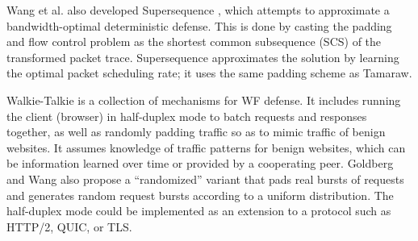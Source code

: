 \documentclass[runningheads]{llncs}
\begin{document}
Wang et al. also developed Supersequence \cite{wang2016website}, which attempts to approximate a bandwidth-optimal
deterministic defense. This is done by casting the padding and flow control problem as the shortest common
subsequence (SCS) of the transformed packet trace. Supersequence approximates the solution by learning the optimal
packet scheduling rate; it uses the same padding scheme as Tamaraw.

Walkie-Talkie \cite{wang2015walkie} is a collection of mechanisms for WF defense. It includes running
the client (browser) in half-duplex mode to batch requests and responses together, as well as randomly
padding traffic so as to mimic traffic of benign websites. It assumes knowledge of traffic patterns for
benign websites, which can be information learned over time or provided by a cooperating peer. Goldberg
and Wang also propose a ``randomized'' variant that pads real bursts of requests and generates random
request bursts according to a uniform distribution. The half-duplex mode could be implemented as an extension
to a protocol such as HTTP/2, QUIC, or TLS.
\end{document}
